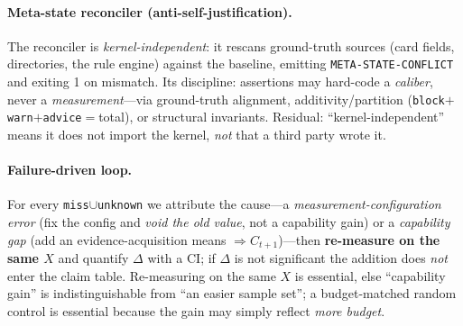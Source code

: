\documentclass{article}
\begin{document}
\paragraph{Meta-state reconciler (anti-self-justification).}
\label{sec:reconciler}
The reconciler is \emph{kernel-independent}: it rescans ground-truth sources (card fields,
directories, the rule engine) against the baseline, emitting \texttt{META-STATE-CONFLICT} and
exiting 1 on mismatch. Its discipline: assertions may hard-code a \emph{caliber}, never a
\emph{measurement}---via ground-truth alignment, additivity/partition
(\texttt{block}$+$\texttt{warn}$+$\texttt{advice}$=$total), or structural invariants. Residual:
``kernel-independent'' means it does not import the kernel, \emph{not} that a third party wrote it.

\paragraph{Failure-driven loop.} For every \texttt{miss}$\cup$\texttt{unknown} we attribute the
cause---a \emph{measurement-configuration error} (fix the config and \emph{void the old value}, not
a capability gain) or a \emph{capability gap} (add an evidence-acquisition means $\Rightarrow
C_{t+1}$)---then \textbf{re-measure on the same $X$} and quantify $\Delta$ with a CI; if $\Delta$
is not significant the addition does \emph{not} enter the claim table. Re-measuring on the same $X$
is essential, else ``capability gain'' is indistinguishable from ``an easier sample set''; a
budget-matched random control is essential because the gain may simply reflect \emph{more budget}.
\end{document}

